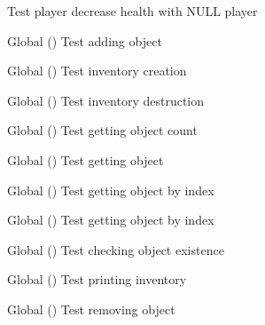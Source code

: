 \begin{DoxyRefList}
\label{test__test000129}%
%
Test player decrease health with NULL player  
\item[Global \doxylink{inventory__test_8c_aa71b62b43df77830d47caa4237ee76a2}{test2\+\_\+inventory\+\_\+add\+\_\+object} ()]\label{test__test000039}%
%
Test adding object  
\item[Global \doxylink{inventory__test_8c_a73a6080c360a8870c4ffc734e989c8b3}{test2\+\_\+inventory\+\_\+create} ()]\label{test__test000035}%
%
Test inventory creation  
\item[Global \doxylink{inventory__test_8c_a9f3daec28c696c0671e6a3e905359741}{test2\+\_\+inventory\+\_\+destroy} ()]\label{test__test000037}%
%
Test inventory destruction  
\item[Global \doxylink{inventory__test_8c_a6ae6ac8b8bc479c81fe89c2e3b4133b0}{test2\+\_\+inventory\+\_\+get\+\_\+num\+\_\+objects} ()]\label{test__test000047}%
%
Test getting object count  
\item[Global \doxylink{inventory__test_8c_a6a440546c4b5335db5bb0e93688bf847}{test2\+\_\+inventory\+\_\+get\+\_\+object} ()]\label{test__test000041}%
%
Test getting object  
\item[Global \doxylink{inventory__test_8c_ac9cca4e85679d9f8c965a410357ae64a}{test2\+\_\+inventory\+\_\+get\+\_\+object\+\_\+by\+\_\+index} ()]\label{test__test000049}%
%
Test getting object by index  
\item[Global \doxylink{inventory__test_8c_a2a77a546e0f46a719124f96bddf1379d}{test2\+\_\+inventory\+\_\+get\+\_\+object\+\_\+index} ()]\label{test__test000051}%
%
Test getting object by index  
\item[Global \doxylink{inventory__test_8c_a7b74f975c41051fab9f54bc1e84ec545}{test2\+\_\+inventory\+\_\+has\+\_\+object} ()]\label{test__test000045}%
%
Test checking object existence  
\item[Global \doxylink{inventory__test_8c_ab416dcaf2ae0f9852a8c6ed5eea4f408}{test2\+\_\+inventory\+\_\+print} ()]\label{test__test000055}%
%
Test printing inventory  
\item[Global \doxylink{inventory__test_8c_a4ea1bbd9668f1049fb98590ffb0dd5db}{test2\+\_\+inventory\+\_\+remove\+\_\+object} ()]\label{test__test000043}%
%
Test removing object  

\end{DoxyRefList}
